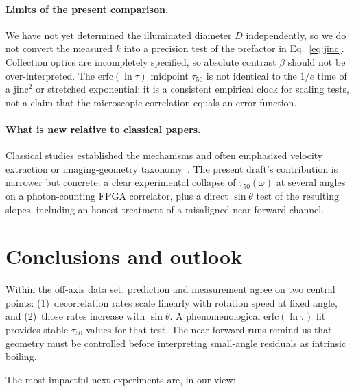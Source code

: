 \documentclass[11pt,letterpaper]{article}
\begin{document}
\paragraph{Limits of the present comparison.}
We have not yet determined the illuminated diameter $D$ independently, so we do
not convert the measured $k$ into a precision test of the prefactor in
Eq.~\eqref{eq:jinc}. Collection optics are incompletely specified, so absolute
contrast $\beta$ should not be over-interpreted. The erfc$(\ln\tau)$ midpoint
$\tau_{50}$ is not identical to the $1/e$ time of a jinc$^2$ or stretched
exponential; it is a consistent empirical clock for scaling tests, not a
claim that the microscopic correlation equals an error function.

\paragraph{What is new relative to classical papers.}
Classical studies established the mechanisms and often emphasized velocity
extraction or imaging-geometry taxonomy~\cite{Saleh1975,Churnside1982,Yoshimura1986}.
The present draft's contribution is narrower but concrete: a clear experimental
collapse of $\tau_{50}(\omega)$ at several angles on a photon-counting FPGA
correlator, plus a direct $\sin\theta$ test of the resulting slopes, including an
honest treatment of a misaligned near-forward channel.

\section{Conclusions and outlook}
\label{sec:conclusions}

Within the off-axis data set, prediction and measurement agree on two central
points: (1)~decorrelation rates scale linearly with rotation speed at fixed
angle, and (2)~those rates increase with $\sin\theta$. A phenomenological
erfc$(\ln\tau)$ fit provides stable $\tau_{50}$ values for that test. The
near-forward runs remind us that geometry must be controlled before interpreting
small-angle residuals as intrinsic boiling.

The most impactful next experiments are, in our view:
\end{document}
